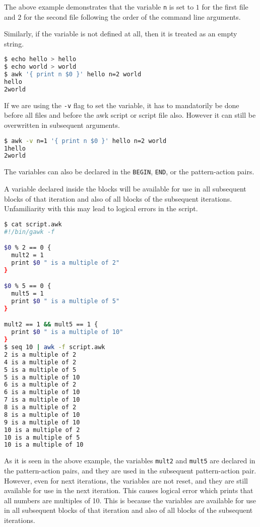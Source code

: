 The above example demonstrates that the variable \lstinline|n| is set to $1$ for the first file and $2$ for the second file following the order of the command line arguments.

Similarly, if the variable is not defined at all, then it is treated as an empty string.

\begin{lstlisting}[language=bash]
$ echo hello > hello
$ echo world > world
$ awk '{ print n $0 }' hello n=2 world
hello
2world
\end{lstlisting}

If we are using the \lstinline|-v| flag to set the variable, it has to mandatorily be done before all files and before the awk script or script file also. However it can still be overwritten in subsequent arguments.

\begin{lstlisting}[language=bash]
$ awk -v n=1 '{ print n $0 }' hello n=2 world
1hello
2world
\end{lstlisting}

The variables can also be declared in the \lstinline|BEGIN|, \lstinline|END|, or the pattern-action pairs.

A variable declared inside the blocks will be available for use in all subsequent blocks of that iteration and also of all blocks of the subsequent iterations.
Unfamiliarity with this may lead to logical errors in the script.

\begin{lstlisting}[language=bash]
$ cat script.awk
#!/bin/gawk -f

$0 % 2 == 0 {
  mult2 = 1
  print $0 " is a multiple of 2"
}

$0 % 5 == 0 {
  mult5 = 1
  print $0 " is a multiple of 5"
}

mult2 == 1 && mult5 == 1 {
  print $0 " is a multiple of 10"
}
$ seq 10 | awk -f script.awk
2 is a multiple of 2
4 is a multiple of 2
5 is a multiple of 5
5 is a multiple of 10
6 is a multiple of 2
6 is a multiple of 10
7 is a multiple of 10
8 is a multiple of 2
8 is a multiple of 10
9 is a multiple of 10
10 is a multiple of 2
10 is a multiple of 5
10 is a multiple of 10
\end{lstlisting}

As it is seen in the above example, the variables \lstinline|mult2| and \lstinline|mult5| are declared in the pattern-action pairs, and they are used in the subsequent pattern-action pair.
However, even for next iterations, the variables are not reset, and they are still available for use in the next iteration. This causes logical error which prints that all numbers are multiples of 10.
This is because the variables are available for use in all subsequent blocks of that iteration and also of all blocks of the subsequent iterations.

